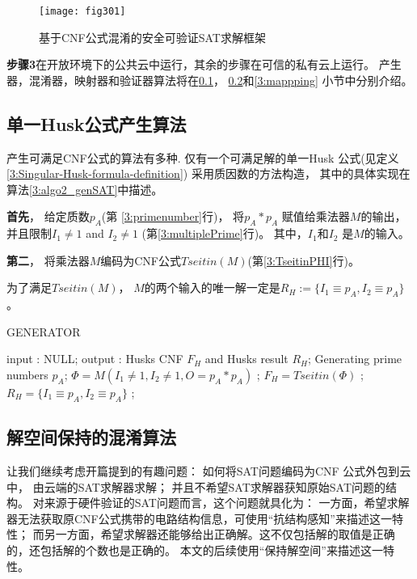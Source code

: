 \begin{figure}
\footnotesize\centering
\centerline{\texttt{[image: fig301]}}
\caption{基于CNF公式混淆的安全可验证SAT求解框架}
\label{3:fig_cldSAT}
\end{figure}

\textbf{步骤3}在开放环境下的公共云中运行，其余的步骤在可信的私有云上运行。
%
产生器，混淆器，映射器和验证器算法将在\ref{3:genhusk}， \ref{3:obfuscating}和\ref{3:mappping} 小节中分别介绍。




\subsection{单一Husk公式产生算法}\label{3:genhusk}

产生可满足CNF公式的算法有多种.
仅有一个可满足解的单一Husk 公式(见定义\ref{3:Singular-Husk-formula-definition}) 采用质因数的方法构造，
其中的具体实现在算法\ref{3:algo2_genSAT}中描述。

\textbf{首先}，
给定质数$p_A$(第 \ref{3:primenumber}行)，
将$p_A * p_A$ 赋值给乘法器$M$的输出，并且限制$I_1\ne 1$ and  $I_2\ne 1$ (第\ref{3:multiplePrime}行)。
其中，$I_1$和$I_2$ 是$M$的输入。

\textbf{第二}，
将乘法器$M$编码为CNF公式$Tseitin(M)$(第\ref{3:TseitinPHI}行)。

为了满足$Tseitin(M)$，
$M$的两个输入的唯一解一定是$R_H:=\{I_1\equiv p_A,I_2\equiv p_A\}$。


%
 \begin{algorithm}[t]
 \caption{GENERATOR}
 \label{3:algo2_genSAT}
 \begin{algorithmic}[1]
 \STATE input : NULL;
 \STATE output : Husks CNF $F_H$ and Husks result $R_H$;
 \STATE Generating prime numbers $p_A$; \label{3:primenumber}
 \STATE $\Phi= M(I_1 \neq 1, I_2\neq 1, O=p_A*p_A)$ ;\label{3:multiplePrime}
 \STATE $F_H=Tseitin(\Phi)$ ;\label{3:TseitinPHI}
 \STATE $R_H=\{I_1\equiv p_A,I_2\equiv p_A\}$ ;
 \end{algorithmic}
 \end{algorithm}

\subsection{解空间保持的混淆算法}\label{3:obfuscating}
让我们继续考虑开篇提到的有趣问题：
如何将SAT问题编码为CNF 公式外包到云中，
由云端的SAT求解器求解；
并且不希望SAT求解器获知原始SAT问题的结构。
对来源于硬件验证的SAT问题而言，这个问题就具化为：
一方面，希望求解器无法获取原CNF公式携带的电路结构信息，可使用“抗结构感知”来描述这一特性；
而另一方面，希望求解器还能够给出正确解。这不仅包括解的取值是正确的，还包括解的个数也是正确的。
本文的后续使用“保持解空间”来描述这一特性。

